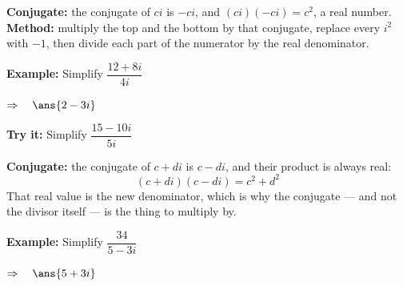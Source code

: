 \documentclass[12pt]{article}
\begin{document}


\begin{formulabox}
\textbf{Conjugate:} the conjugate of $ci$ is $-ci$, and $(ci)(-ci) = c^2$, a real
number.\\[3pt]
\textbf{Method:} multiply the top and the bottom by that conjugate, replace every
$i^2$ with $-1$, then divide each part of the numerator by the real denominator.
\end{formulabox}

\begin{examplebox}
\textbf{Example:} \quad Simplify $\dfrac{12 + 8i}{4i}$

$\Rightarrow\quad \ans{2 - 3i}$
\end{examplebox}

\begin{tryitbox}
\textbf{Try it:} \quad Simplify $\dfrac{15 - 10i}{5i}$\\[2pt]
\end{tryitbox}


\begin{formulabox}
\textbf{Conjugate:} the conjugate of $c + di$ is $c - di$, and their product is
always real:
\[
  (c + di)(c - di) = c^2 + d^2
\]
That real value is the new denominator, which is why the conjugate --- and not
the divisor itself --- is the thing to multiply by.
\end{formulabox}

\begin{examplebox}
\textbf{Example:} \quad Simplify $\dfrac{34}{5 - 3i}$

$\Rightarrow\quad \ans{5 + 3i}$
\end{examplebox}
\end{document}
